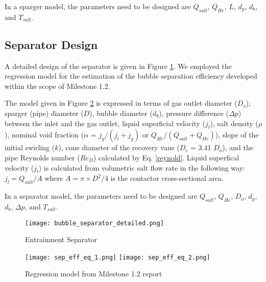     In a sparger model, the parameters need to be designed are $Q_{salt}$, $Q_{He}$, $L$, $d_p$, $d_b$, and $T_{salt}$.

\newpage
\FloatBarrier

\subsection{Separator Design}

    A detailed design of the separator is given in Figure \ref{fig:bubble_sprt}. We employed the regression model for the estimation of the bubble separation efficiency developed within the scope of Milestone 1.2.

    The model given in Figure \ref{fig:reg_model} is expressed in terms of gas outlet diameter ($D_o$), sparger (pipe) diameter ($D$), bubble diameter ($d_b$), pressure difference ($\Delta p$) between the inlet and the gas outlet, liquid superficial velocity ($j_l$), salt density ($\rho$), nominal void fraction ($\alpha$ = $j_g/(j_{l}+j_{g})$ or $Q_{He}/(Q_{salt}+Q_{He})$), slope of the initial swirling ($k$), cone diameter of the recovery vane ($D_c$ = 3.41 $D_o$), and the pipe Reynolds number ($Re_D$) calculated by Eq. \ref{reynold}. Liquid superfical velocity ($j_l$) is calculated from volumetric salt flow rate in the following way: $j_l = Q_{salt}/A$ where $A = \pi\times D^2/4$ is the contactor cross-sectional area.

    In a separator model, the parameters need to be designed are $Q_{salt}$, $Q_{He}$, $D_o$, $d_p$, $d_b$, $\Delta p$, and $T_{salt}$.

    \begin{figure}[htbp!]
        \begin{center}
            \texttt{[image: bubble\_separator\_detailed.png]}
        \end{center}
        \caption{Entrainment Separator}
        \label{fig:bubble_sprt}
    \end{figure}

    \begin{figure}[htbp!]
        \begin{center}
            \texttt{[image: sep\_eff\_eq\_1.png]}
            \texttt{[image: sep\_eff\_eq\_2.png]}
        \end{center}
        \caption{Regression model from Milestone 1.2 report}
        \label{fig:reg_model}
    \end{figure}

